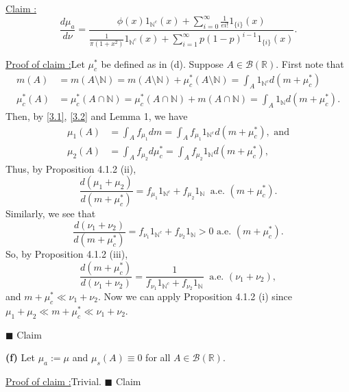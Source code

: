 \documentclass[12pt]{article}
\newcounter{ProofCounter}
\newcounter{ClaimCounter}[ProofCounter]
\newenvironment{claim}[1]{\stepcounter{ClaimCounter}\par\noindent\underline{Claim \theClaimCounter:}\space#1}{}
\newenvironment{claimproof}[1]{\par\noindent\underline{Proof of claim \theClaimCounter:}\space#1}{\hfill $\blacksquare$ Claim \theClaimCounter\vspace{5mm}}
\begin{document}
\begin{claim}
\[ \frac{d\mu_{a}}{d\nu} = \frac{\phi(x)1_{\mathbb{N}^{c}}(x) + \sum_{i=0}^{\infty}\frac{1}{ei!}1_{\{i\}}(x)}{\frac{1}{\pi(1+x^{2})}
1_{\mathbb{N}^{c}}(x) + \sum_{i=1}^{\infty}p(1-p)^{i-1}1_{\{i\}}(x)}. \]
\end{claim}
\vspace{-10mm}
\begin{claimproof}
Let $\mu_{c}^{*}$ be defined as in (d). Suppose $A \in \mathcal{B}(\mathbb{R})$. First note that 
\begin{align}
m(A) & = m(A\setminus \mathbb{N}) = m(A\setminus \mathbb{N}) + \mu_{c}^{*}(A\setminus \mathbb{N}) = \int_{A}1_{\mathbb{N}^{c}}d(m + \mu_{c}^{*})
\label{3.1} \\
\mu_{c}^{*}(A) & = \mu_{c}^{*}(A\cap \mathbb{N}) = \mu_{c}^{*}(A\cap \mathbb{N}) + m(A\cap \mathbb{N}) = \int_{A}1_{\mathbb{N}}d(m + \mu_{c}^{*}).
\label{3.2}
\end{align}
Then, by \eqref{3.1}, \eqref{3.2} and Lemma 1, we have
\begin{align*}
\mu_{1}(A) & = \int_{A}f_{\mu_{1}}dm = \int_{A}f_{\mu_{1}}1_{\mathbb{N}^{c}}d(m + \mu_{c}^{*}), \text{ and}\\
\mu_{2}(A) & = \int_{A}f_{\mu_{2}}d\mu_{c}^{*} = \int_{A}f_{\mu_{2}}1_{\mathbb{N}}d(m + \mu_{c}^{*}),
\end{align*}
Thus, by Proposition 4.1.2 (ii), 
\[ \frac{d(\mu_{1} + \mu_{2})}{d(m + \mu_{c}^{*})} = f_{\mu_{1}}1_{\mathbb{N}^{c}} + f_{\mu_{2}}1_{\mathbb{N}} \ \text{ a.e. }(m + \mu_{c}^{*}). \]
Similarly, we see that 
\[ \frac{d(\nu_{1} + \nu_{2})}{d(m + \mu_{c}^{*})} = f_{\nu_{1}}1_{\mathbb{N}^{c}} + f_{\nu_{2}}1_{\mathbb{N}} > 0 \text{ a.e. }(m + \mu_{c}^{*}). \]
So, by Proposition 4.1.2 (iii), 
\[ \frac{d(m+\mu_{c}^{*})}{d(\nu_{1} + \nu_{2})} = \frac{1}{f_{\nu_{1}}1_{\mathbb{N}^{c}} + f_{\nu_{2}}1_{\mathbb{N}}} \ \text{ a.e. }(\nu_{1} + \nu_{2}), \]
and $m + \mu_{c}^{*} \ll \nu_{1} + \nu_{2}$. Now we can apply Proposition 4.1.2 (i) since $\mu_{1} + \mu_{2} \ll m + \mu_{c}^{*} \ll \nu_{1} + \nu_{2}$.

\end{claimproof}


{\bf (f)}
Let $\mu_{a} := \mu$ and $\mu_{s}(A) \equiv 0$ for all $A \in \mathcal{B}(\mathbb{R})$.

\begin{claimproof}
Trivial.
\end{claimproof}
\end{document}
